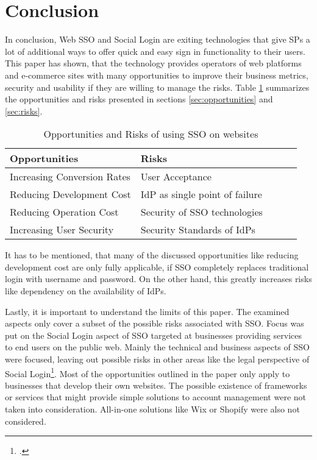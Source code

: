 \newpage
\section{Conclusion}

In conclusion, Web \ac{SSO} and Social Login are exiting technologies that give \acp{SP} a lot of
additional ways to offer quick and easy sign in functionality to their users.
This paper has shown, that the technology provides operators of web platforms and e-commerce sites
with many opportunities to improve their business metrics, security and usability if they are willing
to manage the risks.
Table \ref{tbl:opps_risks} summarizes the opportunities and risks presented in sections \ref{sec:opportunities} and \ref{sec:risks}.

\begin{table}[H]
    \centering
    \begin{tabular}{llrrr}
        \toprule
        Opportunities & Risks \\
        \midrule
          Increasing Conversion Rates & User Acceptance \\
          Reducing Development Cost & \ac{IdP} as single point of failure \\
          Reducing Operation Cost & Security of \ac{SSO} technologies \\
          Increasing User Security & Security Standards of \acp{IdP} \\
        \bottomrule
        \end{tabular}        
    \caption{Opportunities and Risks of using \ac{SSO} on websites}%
    \label{tbl:opps_risks}
  \end{table} 

It has to be mentioned, that many of the discussed opportunities like reducing development cost are only fully applicable, if
\ac{SSO} completely replaces traditional login with username and password. On the other hand, this greatly
increases risks like dependency on the availability of \acp{IdP}.

Lastly, it is important to understand the limits of this paper. The examined aspects only cover a subset of the possible
risks associated with \ac{SSO}. Focus was put on the Social Login aspect of \ac{SSO} targeted at businesses providing
services to end users on the public web. Mainly the technical and business aspects of \ac{SSO} were focused,
leaving out possible risks in other areas like the legal perspective of Social Login\footcite[Cp.][]{Karegar2018}.
Most of the opportunities outlined in the paper only apply to businesses that develop their own websites.
The possible existence of frameworks or services that might provide simple solutions to account management were
not taken into consideration. All-in-one solutions like Wix or Shopify were also not considered.



